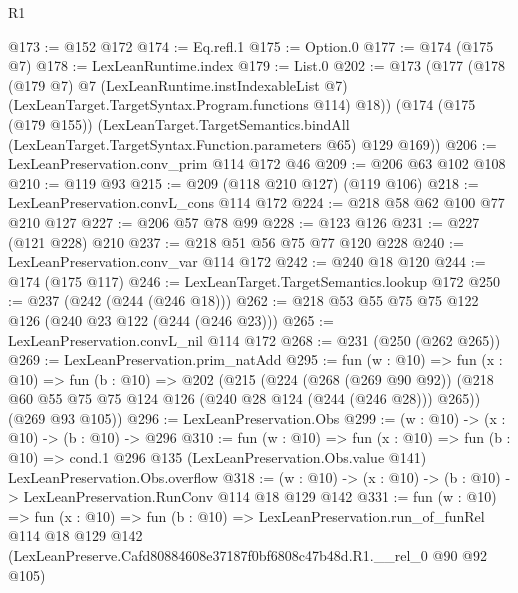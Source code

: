 \begin{lexlean}{R1}
\begin{coremodule}
@173 := @152 @172
@174 := Eq.refl.{1}
@175 := Option.{0}
@177 := @174 (@175 @7)
@178 := LexLeanRuntime.index
@179 := List.{0}
@202 := @173
    (@177
      (@178
        (@179 @7)
        @7
        (LexLeanRuntime.instIndexableList @7)
        (LexLeanTarget.TargetSyntax.Program.functions @114)
        @18))
    (@174
      (@175 (@179 @155))
      (LexLeanTarget.TargetSemantics.bindAll
        (LexLeanTarget.TargetSyntax.Function.parameters @65)
        @129
        @169))
@206 := LexLeanPreservation.conv_prim @114 @172 @46
@209 := @206 @63 @102 @108
@210 := @119 @93
@215 := @209 (@118 @210 @127) (@119 @106)
@218 := LexLeanPreservation.convL_cons @114 @172
@224 := @218 @58 @62 @100 @77 @210 @127
@227 := @206 @57 @78 @99
@228 := @123 @126
@231 := @227 (@121 @228) @210
@237 := @218 @51 @56 @75 @77 @120 @228
@240 := LexLeanPreservation.conv_var @114 @172
@242 := @240 @18 @120
@244 := @174 (@175 @117)
@246 := LexLeanTarget.TargetSemantics.lookup @172
@250 := @237 (@242 (@244 (@246 @18)))
@262 := @218 @53 @55 @75 @75 @122 @126 (@240 @23 @122 (@244 (@246 @23)))
@265 := LexLeanPreservation.convL_nil @114 @172
@268 := @231 (@250 (@262 @265))
@269 := LexLeanPreservation.prim_natAdd
@295 := fun (w : @10) =>
  fun (x : @10) =>
  fun (b : @10) =>
  @202
    (@215
      (@224
        (@268 (@269 @90 @92))
        (@218 @60 @55 @75 @75 @124 @126 (@240 @28 @124 (@244 (@246 @28))) @265))
      (@269 @93 @105))
@296 := LexLeanPreservation.Obs
@299 := (w : @10) -> (x : @10) -> (b : @10) -> @296
@310 := fun (w : @10) =>
  fun (x : @10) =>
  fun (b : @10) =>
  cond.{1} @296 @135 (LexLeanPreservation.Obs.value @141) LexLeanPreservation.Obs.overflow
@318 := (w : @10) -> (x : @10) -> (b : @10) -> LexLeanPreservation.RunConv @114 @18 @129 @142
@331 := fun (w : @10) =>
  fun (x : @10) =>
  fun (b : @10) =>
  LexLeanPreservation.run_of_funRel
    @114
    @18
    @129
    @142
    (LexLeanPreserve.Cafd80884608e37187f0bf6808c47b48d.R1.__rel_0 @90 @92 @105)
\end{coremodule}
\end{lexlean}
